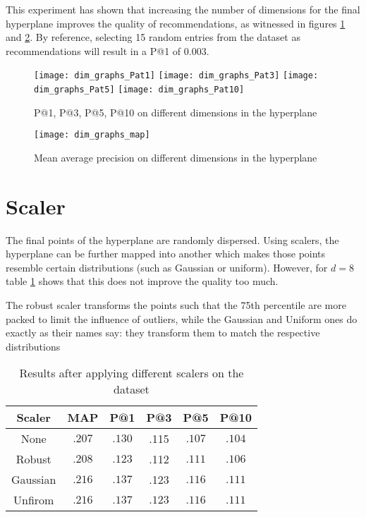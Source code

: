 This experiment has shown that increasing the number of dimensions for the final hyperplane improves the quality of recommendations, as witnessed in figures \ref{fig:dims} and \ref{fig:dims_map}. By reference, selecting 15 random entries from the dataset as recommendations will result in a P@1 of $0.003$.

\begin{figure}[b!]
\centering
\texttt{[image: dim\_graphs\_Pat1]}
\texttt{[image: dim\_graphs\_Pat3]}
\texttt{[image: dim\_graphs\_Pat5]}
\texttt{[image: dim\_graphs\_Pat10]}
\caption{P@1, P@3, P@5, P@10 on different dimensions in the hyperplane}
\label{fig:dims}
\end{figure}

\begin{figure}[b!]
\centering
\texttt{[image: dim\_graphs\_map]}
\caption{ Mean average precision on different dimensions in the hyperplane}
\label{fig:dims_map}
\end{figure}


\section{Scaler}
\label{sec:results_scaler}

The final points of the hyperplane are randomly dispersed. Using scalers, the hyperplane can be further mapped into another which makes those points resemble certain distributions (such as Gaussian or uniform). However, for $d=8$ table \ref{table:scalers} shows that this does not improve the quality too much.

The robust scaler transforms the points such that the 75th percentile are more packed to limit the influence of outliers, while the Gaussian and Uniform ones do exactly as their names say: they transform them to match the respective distributions

\begin{table}[b!]
\centering
\label{table:scalers}
\begin{tabular}{| | c c c c c c | |}
	\hline
		Scaler & MAP & P@1 & P@3 & P@5 & P@10 \\
	\hline
		None & $.207$ & $.130$ & .115 & $.107$ & $.104$ \\
		Robust   & $.208$ & $.123$ & .112 & $.111$ & $.106$ \\
		Gaussian  & $.216$ & $.137$ & .123 & $.116$ & $.111$ \\
		Unfirom  & $.216$ & $.137$ & $.123$ & $.116$ & $.111$ \\
\hline
\end{tabular}
\caption{Results after applying different scalers on the dataset}
\end{table}

